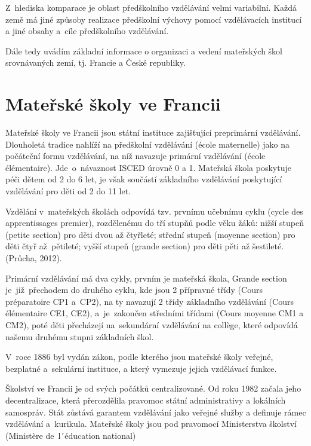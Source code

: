 		Z hlediska komparace je oblast předškolního vzdělávání velmi variabilní. Každá země má jiné způsoby realizace předškolní výchovy pomocí vzdělávacích institucí a jiné obsahy a cíle předškolního vzdělávání. 

		Dále tedy uvádím základní informace o organizaci a vedení mateřských škol srovnávaných zemí, tj. Francie a České republiky.

	\section{Mateřské školy ve Francii}
		Mateřské školy ve Francii jsou státní instituce zajišťující preprimární vzdělávání. Dlouholetá tradice nahlíží na předškolní vzdělávání (école maternelle) jako na počáteční formu vzdělávání, na níž navazuje primární vzdělávání (école élémentaire). Jde o návaznost ISCED  úrovně 0 a 1. Mateřská škola poskytuje péči dětem od 2 do 6 let, je však součástí základního vzdělávání poskytující vzdělávání pro děti od 2 do 11 let.

		Vzdělání v mateřských školách odpovídá tzv. prvnímu učebnímu cyklu (cycle des apprentissages premier), rozdělenému do tří stupňů podle věku žáků: nižší stupeň (petite section) pro děti dvou až čtyřleté; střední stupeň (moyenne section) pro děti čtyř až pětileté; vyšší stupeň (grande section) pro děti pěti až šestileté.
		(Průcha, 2012). 

		Primární vzdělávání má dva cykly, prvním je mateřská škola, Grande section je již přechodem do druhého cyklu, kde jsou 2 přípravné třídy (Cours préparatoire CP1 a CP2), na ty navazují 2 třídy základního vzdělávání (Cours élémentaire CE1, CE2), a je zakončen středními třídami (Cours moyenne CM1 a CM2), poté děti přecházejí na sekundární vzdělávání na collège, které odpovídá našemu druhému stupni základních škol. 

		V roce 1886 byl vydán zákon, podle kterého jsou mateřské školy veřejné, bezplatné a sekulární instituce, a který vymezuje jejich vzdělávací funkce. 

		Školství ve Francii je od svých počátků centralizované. Od roku 1982 začala jeho decentralizace, která přerozdělila pravomoc státní administrativy a lokálních samospráv. Stát zůstává garantem vzdělávání jako veřejné služby a definuje rámec vzdělávání a kurikula. Mateřské školy jsou pod pravomocí Ministerstva školství (Ministère de l´éducation national)

